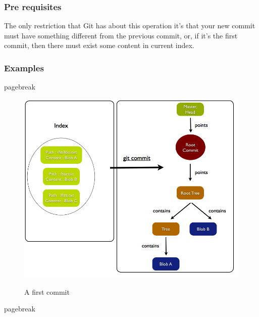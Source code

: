 \subsubsection{Pre requisites}

The only restriction that Git has about this operation 
it's that your new commit must have something different from the previous
commit, or, if it's the first commit, then there must exist some content in
current index. \par


\subsubsection{Examples}


pagebreak
\pagebreak

\begin{figure}[h] 
	\caption{A first commit}
	\centering
	\includegraphics[scale=0.4]{images/commit1.png}
	\label{fig:commit1}
\end{figure}

pagebreak
\pagebreak



